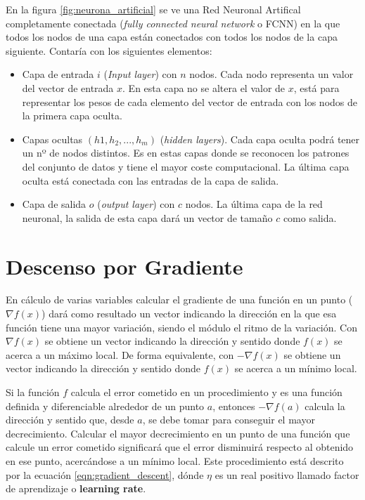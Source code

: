 En la figura \ref{fig:neurona_artificial} se ve una Red Neuronal Artifical completamente conectada (\textit{fully connected neural network} o FCNN) en la que todos los nodos de una capa están conectados con todos los nodos de la capa siguiente. Contaría con los siguientes elementos:
\begin{itemize}
\item Capa de entrada $i$ (\textit{Input layer}) con $ n $ nodos. Cada nodo representa un valor del vector de entrada $ x $. En esta capa no se altera el valor de $x$, está para representar los pesos de cada elemento del vector de entrada con los nodos de la primera capa oculta.
\item Capas ocultas $(h1, h_2, ..., h_m)$ (\textit{hidden layers}). Cada capa oculta podrá tener un nº de nodos distintos. Es en estas capas donde se reconocen los patrones del conjunto de datos y tiene el mayor coste computacional. La última capa oculta está conectada con las entradas de la capa de salida.
\item Capa de salida $o$ (\textit{output layer}) con $c$ nodos. La última capa de la red neuronal, la salida de esta capa dará un vector de tamaño $c$ como salida.
\end{itemize}

\section{Descenso por Gradiente }\label{sec:gradient_descent}

En cálculo de varias variables calcular el gradiente de una función en un punto ($\nabla f(x)$) dará como resultado un vector indicando la dirección en la que esa función tiene una mayor variación, siendo el módulo el ritmo de la variación. Con $\nabla f(x)$ se obtiene un vector indicando la dirección y sentido donde $f(x)$ se acerca a un máximo local. De forma equivalente, con $-\nabla f(x)$ se obtiene un vector indicando la dirección y sentido donde $f(x)$ se acerca a un mínimo local.

Si la función $f$ calcula el error cometido en un procedimiento y es una función definida y diferenciable alrededor de un punto $a$, entonces $-\nabla f(a)$ calcula la dirección y sentido que, desde $a$, se debe tomar para conseguir el mayor decrecimiento. Calcular el mayor decrecimiento en un punto de una función que calcule un error cometido significará que el error disminuirá respecto al obtenido en ese punto, acercándose a un mínimo local. Este procedimiento está descrito por la ecuación \ref{eqn:gradient_descent}, dónde $\eta$ es un real positivo llamado factor de aprendizaje o \textbf{learning rate}.

